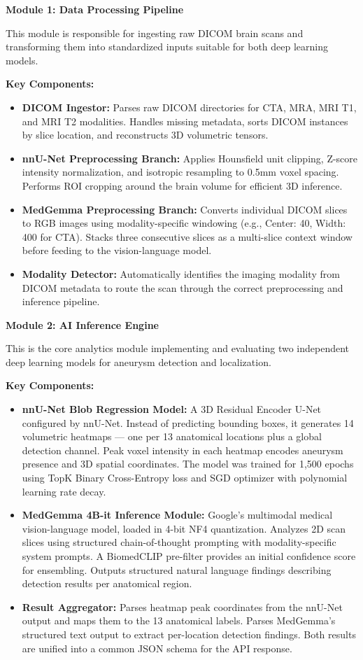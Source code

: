 \documentclass[twoside,a4paper,openright]{report} %
\begin{document}
\medskip\noindent
\textbf{Module 1: Data Processing Pipeline}

\noindent This module is responsible for ingesting raw DICOM brain scans and transforming them into standardized inputs suitable for both deep learning models.

\noindent\textbf{Key Components:}
\begin{itemize}
  \item \textbf{DICOM Ingestor:} Parses raw DICOM directories for CTA, MRA, MRI T1, and MRI T2 modalities. Handles missing metadata, sorts DICOM instances by slice location, and reconstructs 3D volumetric tensors.
  \item \textbf{nnU-Net Preprocessing Branch:} Applies Hounsfield unit clipping, Z-score intensity normalization, and isotropic resampling to 0.5mm voxel spacing. Performs ROI cropping around the brain volume for efficient 3D inference.
  \item \textbf{MedGemma Preprocessing Branch:} Converts individual DICOM slices to RGB images using modality-specific windowing (e.g., Center: 40, Width: 400 for CTA). Stacks three consecutive slices as a multi-slice context window before feeding to the vision-language model.
  \item \textbf{Modality Detector:} Automatically identifies the imaging modality from DICOM metadata to route the scan through the correct preprocessing and inference pipeline.
\end{itemize}


\medskip\noindent
\textbf{Module 2: AI Inference Engine}

\noindent This is the core analytics module implementing and evaluating two independent deep learning models for aneurysm detection and localization.

\noindent\textbf{Key Components:}
\begin{itemize}
  \item \textbf{nnU-Net Blob Regression Model:} A 3D Residual Encoder U-Net configured by nnU-Net. Instead of predicting bounding boxes, it generates 14 volumetric heatmaps --- one per 13 anatomical locations plus a global detection channel. Peak voxel intensity in each heatmap encodes aneurysm presence and 3D spatial coordinates. The model was trained for 1,500 epochs using TopK Binary Cross-Entropy loss and SGD optimizer with polynomial learning rate decay.
  \item \textbf{MedGemma 4B-it Inference Module:} Google's multimodal medical vision-language model, loaded in 4-bit NF4 quantization. Analyzes 2D scan slices using structured chain-of-thought prompting with modality-specific system prompts. A BiomedCLIP pre-filter provides an initial confidence score for ensembling. Outputs structured natural language findings describing detection results per anatomical region.
  \item \textbf{Result Aggregator:} Parses heatmap peak coordinates from the nnU-Net output and maps them to the 13 anatomical labels. Parses MedGemma's structured text output to extract per-location detection findings. Both results are unified into a common JSON schema for the API response.
\end{itemize}
\end{document}
